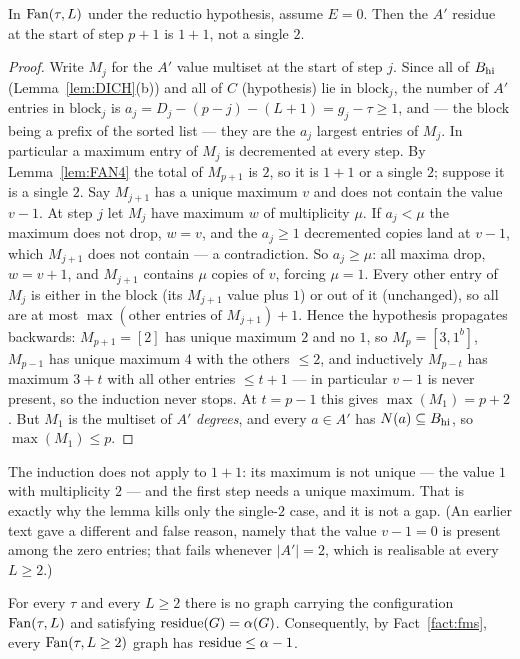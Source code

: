 \begin{lemma}\label{lem:FAN6}
In $\mathrm{Fan}(\tau,L)$ under the reductio hypothesis, assume $E = 0$. Then the $A'$ residue at
the start of step $p+1$ is $1+1$, not a single $2$.
\end{lemma}

\begin{proof}
Write $M_j$ for the $A'$ value multiset at the start of step $j$. Since all of $B_{\mathrm{hi}}$
(Lemma~\ref{lem:DICH}(b)) and all of $C$ (hypothesis) lie in $\mathrm{block}_j$, the number
of $A'$ entries in $\mathrm{block}_j$ is $a_j = D_j - (p-j) - (L+1) = g_j - \tau \ge 1$, and
--- the block being a prefix of the sorted list --- they are the $a_j$ largest entries of
$M_j$. In particular a maximum entry of $M_j$ is decremented at every step. By
Lemma~\ref{lem:FAN4} the total of $M_{p+1}$ is $2$, so it is $1+1$ or a single $2$; suppose
it is a single $2$. Say $M_{j+1}$ has a unique maximum $v$ and does not contain the value
$v-1$. At step $j$ let $M_j$ have maximum $w$ of multiplicity $\mu$. If $a_j < \mu$ the
maximum does not drop, $w = v$, and the $a_j \ge 1$ decremented copies land at $v-1$, which
$M_{j+1}$ does not contain --- a contradiction. So $a_j \ge \mu$: all maxima drop,
$w = v+1$, and $M_{j+1}$ contains $\mu$ copies of $v$, forcing $\mu = 1$. Every other entry
of $M_j$ is either in the block (its $M_{j+1}$ value plus $1$) or out of it (unchanged), so
all are at most $\max(\text{other entries of } M_{j+1}) + 1$. Hence the hypothesis
propagates backwards: $M_{p+1} = [2]$ has unique maximum $2$ and no $1$, so $M_p = [3,1^b]$,
$M_{p-1}$ has unique maximum $4$ with the others $\le 2$, and inductively $M_{p-t}$ has
maximum $3+t$ with all other entries $\le t+1$ --- in particular $v-1$ is never present, so
the induction never stops. At $t = p-1$ this gives $\max(M_1) = p+2$. But $M_1$ is the
multiset of $A'$ \emph{degrees}, and every $a \in A'$ has $N(a) \subseteq B_{\mathrm{hi}}$, so
$\max(M_1) \le p$.
\end{proof}

The induction does not apply to $1+1$: its maximum is not unique --- the value $1$ with
multiplicity $2$ --- and the first step needs a unique maximum. That is exactly why the
lemma kills only the single-$2$ case, and it is not a gap. (An earlier text gave a different
and false reason, namely that the value $v-1 = 0$ is present among the zero entries; that
fails whenever $|A'| = 2$, which is realisable at every $L \ge 2$.)

\begin{theorem}\label{thm:FAN}
For every $\tau$ and every $L \ge 2$ there is no graph carrying the configuration
$\mathrm{Fan}(\tau,L)$ and satisfying $\operatorname{residue}(G) = \alpha(G)$. Consequently, by
Fact~\ref{fact:fms}, every $\mathrm{Fan}(\tau,L\ge2)$ graph has $\operatorname{residue} \le \alpha - 1$.
\end{theorem}

